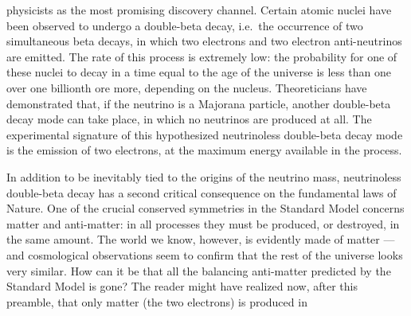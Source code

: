 physicists as the most promising discovery channel. Certain atomic nuclei have been
observed to undergo a double-beta decay, i.e.~the occurrence of two simultaneous beta
decays, in which two electrons and two electron anti-neutrinos are emitted. The rate of
this process is extremely low: the probability for one of these nuclei to decay in a time
equal to the age of the universe is less than one over one billionth ore more, depending
on the nucleus. Theoreticians have demonstrated that, if the neutrino is a Majorana
particle, another double-beta decay mode can take place, in which no neutrinos are
produced at all. The experimental signature of this hypothesized neutrinoless double-beta
decay mode is the emission of two electrons, at the maximum energy available in the
process.
\newpar
\begin{center}
\end{center}
In addition to be inevitably tied to the origins of the neutrino mass, neutrinoless
double-beta decay has a second critical consequence on the fundamental laws of Nature. One
of the crucial conserved symmetries in the Standard Model concerns matter and anti-matter:
in all processes they must be produced, or destroyed, in the same amount.  The world we
know, however, is evidently made of matter --- and cosmological observations seem to
confirm that the rest of the universe looks very similar. How can it be that all the
balancing anti-matter predicted by the Standard Model is gone? The reader might have
realized now, after this preamble, that only matter (the two electrons) is produced in
